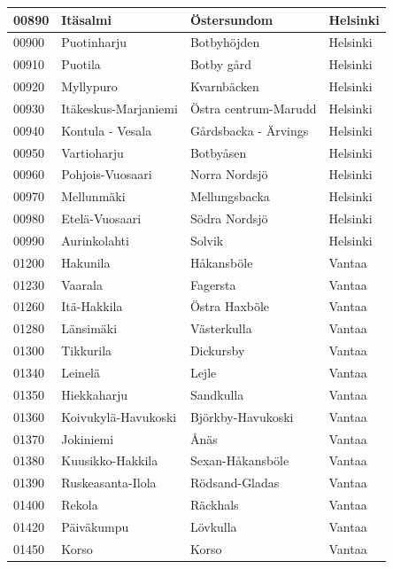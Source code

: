 \begin{longtable}{llll}
    00890 & Itäsalmi & Östersundom & Helsinki \\ [0.25ex] \hline
    00900 & Puotinharju & Botbyhöjden & Helsinki \\ [0.25ex] \hline
    00910 & Puotila & Botby gård & Helsinki \\ [0.25ex] \hline
    00920 & Myllypuro & Kvarnbäcken & Helsinki \\ [0.25ex] \hline
    00930 & Itäkeskus-Marjaniemi & Östra centrum-Marudd & Helsinki \\ [0.25ex] \hline
    00940 & Kontula - Vesala & Gårdsbacka - Ärvings & Helsinki \\ [0.25ex] \hline
    00950 & Vartioharju & Botbyåsen & Helsinki \\ [0.25ex] \hline
    00960 & Pohjois-Vuosaari & Norra  Nordsjö & Helsinki \\ [0.25ex] \hline
    00970 & Mellunmäki & Mellungsbacka & Helsinki \\ [0.25ex] \hline
    00980 & Etelä-Vuosaari & Södra Nordsjö & Helsinki \\ [0.25ex] \hline
    00990 & Aurinkolahti & Solvik & Helsinki \\ [0.25ex] \hline
    01200 & Hakunila & Håkansböle & Vantaa \\ [0.25ex] \hline
    01230 & Vaarala & Fagersta & Vantaa \\ [0.25ex] \hline
    01260 & Itä-Hakkila & Östra Haxböle & Vantaa \\ [0.25ex] \hline
    01280 & Länsimäki & Västerkulla & Vantaa \\ [0.25ex] \hline
    01300 & Tikkurila & Dickursby & Vantaa \\ [0.25ex] \hline
    01340 & Leinelä & Lejle & Vantaa \\ [0.25ex] \hline
    01350 & Hiekkaharju & Sandkulla & Vantaa \\ [0.25ex] \hline
    01360 & Koivukylä-Havukoski & Björkby-Havukoski & Vantaa \\ [0.25ex] \hline
    01370 & Jokiniemi & Ånäs & Vantaa \\ [0.25ex] \hline
    01380 & Kuusikko-Hakkila & Sexan-Håkansböle & Vantaa \\ [0.25ex] \hline
    01390 & Ruskeasanta-Ilola & Rödsand-Gladas & Vantaa \\ [0.25ex] \hline
    01400 & Rekola & Räckhals & Vantaa \\ [0.25ex] \hline
    01420 & Päiväkumpu & Lövkulla & Vantaa \\ [0.25ex] \hline
    01450 & Korso & Korso & Vantaa \\ [0.25ex] \hline

\end{longtable}
